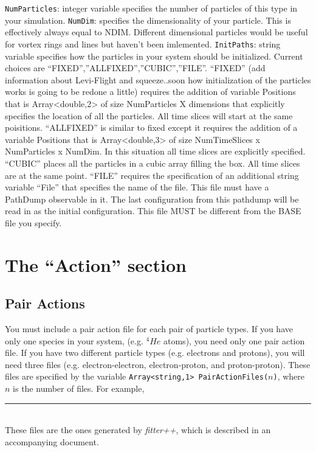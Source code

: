 \documentclass{book}
\begin{document}
\begin{itemize}
       \subsubitem \texttt{NumParticles}: integer variable specifies
   the number of particles of this type in your simulation.
       \subsubitem \texttt{NumDim}: specifies the dimensionality of
   your particle.  This is effectively always equal to NDIM.
   Different dimensional particles would be useful for vortex rings
   and lines but haven't been imlemented.
       \subsubitem \texttt{InitPaths}: string variable specifies how
   the particles in your system should be initialized. Current choices
   are ``FIXED'',''ALLFIXED'',''CUBIC'',''FILE''.  ``FIXED'' (add
   information about Levi-Flight and squeeze..soon how initialization of the
   particles works is going to be redone a little) requires
   the addition of variable Positions that is  Array<double,2> of size
   NumParticles X dimensions that explicitly specifies the location of
   all the particles.  All time slices will start at the same
   poisitions.  ``ALLFIXED'' is similar to fixed except it requires
   the addition of a variable Positions that is Array<double,3> of
   size NumTimeSlices x NumParticles x NumDim.  In this situation all
   time slices are explicitly specified. ``CUBIC'' places all the
   particles in a cubic array filling the box. All time slices are at
   the same point.  ``FILE''  requires the specification of an
   additional string variable ``File'' that specifies the name of the
   file. This file must have a PathDump observable in it. The last
   configuration from this pathdump will be read in as the initial
   configuration. This file MUST be different from the BASE file you
   specify. 
     
\end{itemize}


\section{The ``Action'' section}
\subsection{Pair Actions}
You must include a pair action file for each pair of particle types.
If you have only one species in your system, (e.g. $^4He$ atoms), you
need only one pair action file.  If you have two different particle types
(e.g. electrons and protons), you will need three files
(e.g. electron-electron, electron-proton, and proton-proton).  These
files are specified by the variable \texttt{Array<string,1>
  PairActionFiles($n$)}, where $n$ is the number of files.  For
example, \\ 
\rule{0.6cm}{0cm}\\
These files are the ones generated by {\em fitter++}, which is
described in an accompanying document.
\end{document}
